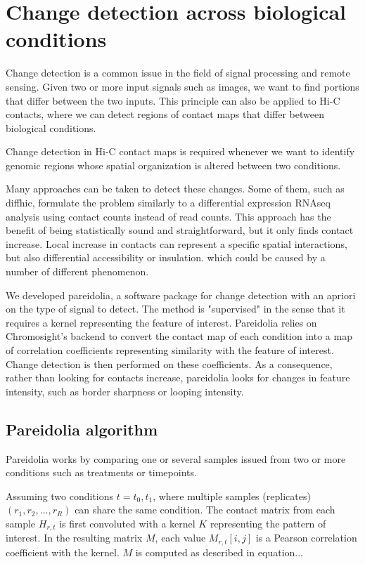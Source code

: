 \section{Change detection across biological conditions}

Change detection is a common issue in the field of signal processing and remote sensing. Given two or more input signals such as images, we want to find portions that differ between the two inputs. This principle can also be applied to Hi-C contacts, where we can detect regions of contact maps that differ between biological conditions.

Change detection in Hi-C contact maps is required whenever we want to identify genomic regions whose spatial organization is altered between two conditions.

Many approaches can be taken to detect these changes. Some of them, such as diffhic, formulate the problem similarly to a differential expression RNAseq analysis using contact counts instead of read counts. This approach has the benefit of being statistically sound and straightforward, but it only finds contact increase. Local increase in contacts can represent a specific spatial interactions, but also differential accessibility or insulation. which could be caused by a number of different phenomenon.

We developed pareidolia, a software package for change detection with an apriori on the type of signal to detect. The method is "supervised" in the sense that it requires a kernel representing the feature of interest. Pareidolia relies on Chromosight's backend to convert the contact map of each condition into a map of correlation coefficients representing similarity with the feature of interest. Change detection is then performed on these coefficients. As a consequence, rather than looking for contacts increase, pareidolia looks for changes in feature intensity, such as border sharpness or looping intensity.

\subsection{Pareidolia algorithm}

Pareidolia works by comparing one or several samples issued from two or more conditions such as treatments or timepoints.

Assuming two conditions $t={t_0, t_1}$, where multiple samples (replicates) $(r_1, r_2, ..., r_R)$ can share the same condition. The contact matrix from each sample $H_{r, t}$ is first convoluted with a kernel $K$ representing the pattern of interest. In the resulting matrix $M$, each value $M_{r, t}[i, j]$ is a Pearson correlation coefficient with the kernel. $M$ is computed as described in equation...


